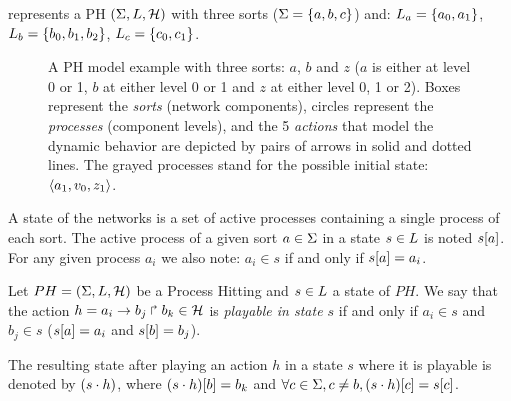 \begin{example*}
 represents a PH $(\Sigma,L,\mathcal{H})$ with three sorts
($\Sigma = \{a, b, c\}$) and:
$L_a = \{a_0, a_1\}$,
$L_b = \{b_0, b_1, b_2\}$,
$L_c = \{c_0, c_1\}$.
\begin{figure}[ht]
\centering
{}
\caption{\label{fig:ph} 
A PH model example with three sorts: $a$, $b$ and $z$ ($a$ is either at level 0 or 1, $b$ at either level 0 or 1 and $z$ at either level 0, 1 or 2). Boxes represent the \emph{sorts} (network components), circles represent the \emph{processes} (component levels), and the 5 \emph{actions} that model the dynamic behavior are depicted by pairs of arrows in solid and dotted lines. The grayed processes stand for the possible initial state: $\langle a_1, v_0, z_1 \rangle$.
}
\end{figure}
\end{example*}
A state of the networks is a set of active processes containing a single process of each sort.
The active process of a given sort $a \in \Sigma$ in a state $s \in L$
is noted ${s[a]}$.
For any given process $a_i$ we also note: $a_i \in s$ if and only if ${s[a]} = a_i$.

\begin{definition} 
\label{def:playableAction}
Let $PH = (\Sigma,L,\mathcal{H})$ be a Process Hitting and $s \in L$ a state of $PH$. We say that the action $h = a_i\rightarrow b_j\Rsh b_k \in \mathcal{H}$ is \emph{playable in state $s$} if and only if $a_i \in s$ and $b_j \in s$ (\ie ${s[a]} = a_i$ and ${s[b]}=b_j$).
\end{definition}
The resulting state after playing an action $h$ in a state $s$ where it is playable is denoted by $(s \cdot h)$, where ${(s \cdot h)[b]} = b_k$ and $\forall c \in \Sigma, c \neq b, {(s \cdot h)[c]}={s[c]}$.

